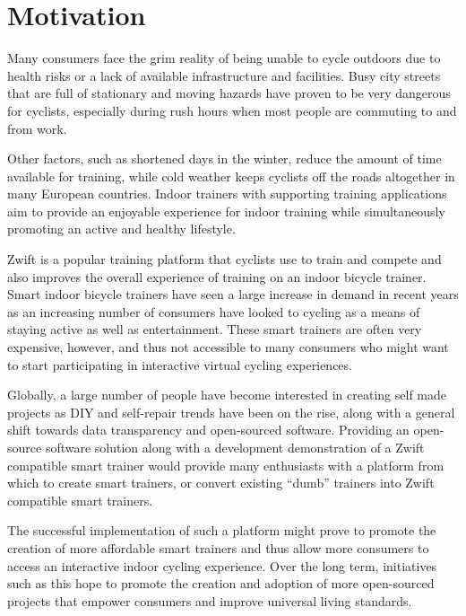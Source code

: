 \vspace*{-0.5cm}

\section{Motivation}

Many consumers face the grim reality of being unable to cycle outdoors due to health risks or a lack of available infrastructure and facilities. Busy city streets that are full of stationary and moving hazards have proven to be very dangerous for cyclists, especially during rush hours when most people are commuting to and from work. 

Other factors, such as shortened days in the winter, reduce the amount of time available for training, while cold weather keeps cyclists off the roads altogether in many European countries. Indoor trainers with supporting training applications aim to provide an enjoyable experience for indoor training while simultaneously promoting an active and healthy lifestyle. 

Zwift is a popular training platform that cyclists use to train and compete and also improves the overall experience of training on an indoor bicycle trainer. Smart indoor bicycle trainers have seen a large increase in demand in recent years as an increasing number of consumers have looked to cycling as a means of staying active as well as entertainment. These smart trainers are often very expensive, however, and thus not accessible to many consumers who might want to start participating in interactive virtual cycling experiences.

Globally, a large number of people have become interested in creating self made projects as DIY and self-repair trends have been on the rise, along with a general shift towards data transparency and open-sourced software. Providing an open-source software solution along with a development demonstration of a Zwift compatible smart trainer would provide many enthusiasts with a platform from which to create smart trainers, or convert existing ``dumb'' trainers into Zwift compatible smart trainers.

The successful implementation of such a platform might prove to promote the creation of more affordable smart trainers and thus allow more consumers to access an interactive indoor cycling experience. Over the long term, initiatives such as this hope to promote the creation and adoption of more open-sourced projects that empower consumers and improve universal living standards.